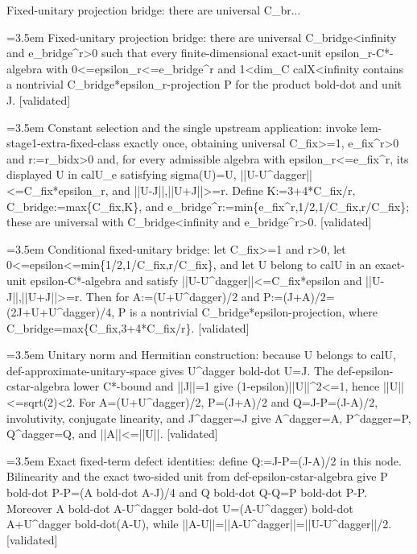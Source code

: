 \documentclass{article}
\newcommand{\step}[1]{\par\noindent\hangindent=3.5em\hangafter=1%
  \makebox[3.5em][l]{\textbf{#1.}}}
\newcommand{\steptag}[1]{\hfill{\small\textsf{[#1]}}}
\begin{document}
\begin{proofbox}{Fixed-unitary projection bridge: there are universal C\_br...}
\step{1} Fixed-unitary projection bridge: there are universal C\_bridge<infinity and e\_bridge\textasciicircum{}r>0 such that every finite-dimensional exact-unit epsilon\_r-C*-algebra with 0<=epsilon\_r<=e\_bridge\textasciicircum{}r and 1<dim\_C calX<infinity contains a nontrivial C\_bridge*epsilon\_r-projection P for the product bold-dot and unit J. \steptag{validated} \\[6pt]
\step{1.1} Constant selection and the single upstream application: invoke lem-stage1-extra-fixed-class exactly once, obtaining universal C\_fix>=1, e\_fix\textasciicircum{}r>0 and r:=r\_bidx>0 and, for every admissible algebra with epsilon\_r<=e\_fix\textasciicircum{}r, its displayed U in calU\_e satisfying sigma(U)=U, ||U-U\textasciicircum{}dagger||<=C\_fix*epsilon\_r, and ||U-J||,||U+J||>=r. Define K:=3+4*C\_fix/r, C\_bridge:=max\{C\_fix,K\}, and e\_bridge\textasciicircum{}r:=min\{e\_fix\textasciicircum{}r,1/2,1/C\_fix,r/C\_fix\}; these are universal with C\_bridge<infinity and e\_bridge\textasciicircum{}r>0. \steptag{validated} \\[4pt]
\step{1.2} Conditional fixed-unitary bridge: let C\_fix>=1 and r>0, let 0<=epsilon<=min\{1/2,1/C\_fix,r/C\_fix\}, and let U belong to calU in an exact-unit epsilon-C*-algebra and satisfy ||U-U\textasciicircum{}dagger||<=C\_fix*epsilon and ||U-J||,||U+J||>=r. Then for A:=(U+U\textasciicircum{}dagger)/2 and P:=(J+A)/2=(2J+U+U\textasciicircum{}dagger)/4, P is a nontrivial C\_bridge*epsilon-projection, where C\_bridge=max\{C\_fix,3+4*C\_fix/r\}. \steptag{validated} \\[6pt]
\step{1.2.1} Unitary norm and Hermitian construction: because U belongs to calU, def-approximate-unitary-space gives U\textasciicircum{}dagger bold-dot U=J. The def-epsilon-cstar-algebra lower C*-bound and ||J||=1 give (1-epsilon)||U||\textasciicircum{}2<=1, hence ||U||<=sqrt(2)<2. For A=(U+U\textasciicircum{}dagger)/2, P=(J+A)/2 and Q=J-P=(J-A)/2, involutivity, conjugate linearity, and J\textasciicircum{}dagger=J give A\textasciicircum{}dagger=A, P\textasciicircum{}dagger=P, Q\textasciicircum{}dagger=Q, and ||A||<=||U||. \steptag{validated} \\[4pt]
\step{1.2.2} Exact fixed-term defect identities: define Q:=J-P=(J-A)/2 in this node. Bilinearity and the exact two-sided unit from def-epsilon-cstar-algebra give P bold-dot P-P=(A bold-dot A-J)/4 and Q bold-dot Q-Q=P bold-dot P-P. Moreover A bold-dot A-U\textasciicircum{}dagger bold-dot U=(A-U\textasciicircum{}dagger) bold-dot A+U\textasciicircum{}dagger bold-dot(A-U), while ||A-U||=||A-U\textasciicircum{}dagger||=||U-U\textasciicircum{}dagger||/2. \steptag{validated} \\[4pt]

\end{proofbox}
\end{document}
